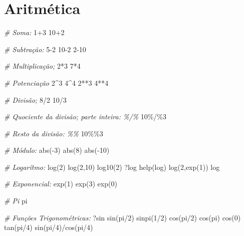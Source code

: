 \documentclass[
  12pt,
  brazilian,
]{book}
\newenvironment{Shaded}{\begin{snugshade}}{\end{snugshade}}
\newcommand{\CommentTok}[1]{\textcolor[rgb]{0.56,0.35,0.01}{\textit{#1}}}
\newcommand{\DecValTok}[1]{\textcolor[rgb]{0.00,0.00,0.81}{#1}}
\newcommand{\FunctionTok}[1]{\textcolor[rgb]{0.00,0.00,0.00}{#1}}
\newcommand{\NormalTok}[1]{#1}
\newcommand{\SpecialCharTok}[1]{\textcolor[rgb]{0.00,0.00,0.00}{#1}}
\begin{document}
\hypertarget{aritmuxe9tica}{%
\section{Aritmética}\label{aritmuxe9tica}}

\begin{Shaded}
\begin{Highlighting}[]
\CommentTok{\# Soma:}
\DecValTok{1}\SpecialCharTok{+}\DecValTok{3}
\DecValTok{10}\SpecialCharTok{+}\DecValTok{2}

\CommentTok{\# Subtração:}
\DecValTok{5{-}2}
\DecValTok{10{-}2}
\DecValTok{2{-}10}

\CommentTok{\# Multiplicação;}
\DecValTok{2}\SpecialCharTok{*}\DecValTok{3}
\DecValTok{7}\SpecialCharTok{*}\DecValTok{4}

\CommentTok{\# Potenciação}
\DecValTok{2}\SpecialCharTok{\^{}}\DecValTok{3}
\DecValTok{4}\SpecialCharTok{\^{}}\DecValTok{4}
\DecValTok{2}\SpecialCharTok{**}\DecValTok{3}
\DecValTok{4}\SpecialCharTok{**}\DecValTok{4}

\CommentTok{\# Divisão;}
\DecValTok{8}\SpecialCharTok{/}\DecValTok{2}
\DecValTok{10}\SpecialCharTok{/}\DecValTok{3}

\CommentTok{\# Quociente da divisão; parte inteira: \%/\%}
\DecValTok{10}\SpecialCharTok{\%/\%}\DecValTok{3}

\CommentTok{\# Resto da divisão: \%\%}
\DecValTok{10}\SpecialCharTok{\%\%}\DecValTok{3}

\CommentTok{\# Módulo:}
\FunctionTok{abs}\NormalTok{(}\SpecialCharTok{{-}}\DecValTok{3}\NormalTok{)}
\FunctionTok{abs}\NormalTok{(}\DecValTok{8}\NormalTok{)}
\FunctionTok{abs}\NormalTok{(}\SpecialCharTok{{-}}\DecValTok{10}\NormalTok{)}

\CommentTok{\# Logarítmo:}
\FunctionTok{log}\NormalTok{(}\DecValTok{2}\NormalTok{)}
\FunctionTok{log}\NormalTok{(}\DecValTok{2}\NormalTok{,}\DecValTok{10}\NormalTok{)}
\FunctionTok{log10}\NormalTok{(}\DecValTok{2}\NormalTok{)}
\NormalTok{?log}
\FunctionTok{help}\NormalTok{(log)}
\FunctionTok{log}\NormalTok{(}\DecValTok{2}\NormalTok{,}\FunctionTok{exp}\NormalTok{(}\DecValTok{1}\NormalTok{))}
\NormalTok{log}

\CommentTok{\# Exponencial:}
\FunctionTok{exp}\NormalTok{(}\DecValTok{1}\NormalTok{)}
\FunctionTok{exp}\NormalTok{(}\DecValTok{3}\NormalTok{)}
\FunctionTok{exp}\NormalTok{(}\DecValTok{0}\NormalTok{)}

\CommentTok{\# Pi}
\NormalTok{pi}

\CommentTok{\# Funções Trigonométricas:}
\NormalTok{?sin}
\FunctionTok{sin}\NormalTok{(pi}\SpecialCharTok{/}\DecValTok{2}\NormalTok{)}
\FunctionTok{sinpi}\NormalTok{(}\DecValTok{1}\SpecialCharTok{/}\DecValTok{2}\NormalTok{)}
\FunctionTok{cos}\NormalTok{(pi}\SpecialCharTok{/}\DecValTok{2}\NormalTok{)}
\FunctionTok{cos}\NormalTok{(pi)}
\FunctionTok{cos}\NormalTok{(}\DecValTok{0}\NormalTok{)}
\FunctionTok{tan}\NormalTok{(pi}\SpecialCharTok{/}\DecValTok{4}\NormalTok{)}
\FunctionTok{sin}\NormalTok{(pi}\SpecialCharTok{/}\DecValTok{4}\NormalTok{)}\SpecialCharTok{/}\FunctionTok{cos}\NormalTok{(pi}\SpecialCharTok{/}\DecValTok{4}\NormalTok{)}


\end{Highlighting}
\end{Shaded}
\end{document}
